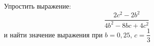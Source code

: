 \begin{ex}
	\begin{condition}
		Упростить выражение:
		\[ \dfrac{2c^2-2b^2}{4b^2-8bc+4c^2} \]
		и найти значение выражения при \( b=0,25 \), \( c=\dfrac{1}{3} \)
	\end{condition}
\end{ex}
